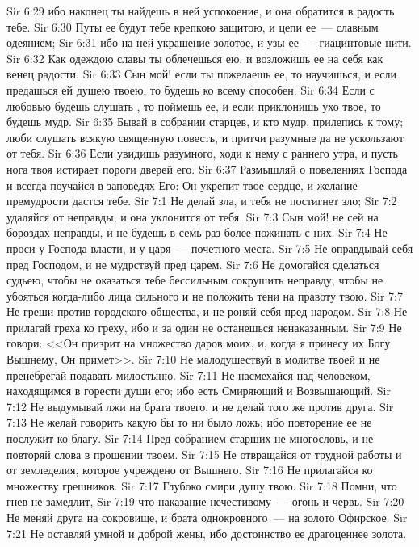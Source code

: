 \vs Sir 6:29 ибо наконец ты найдешь в ней успокоение, и она обратится в радость тебе.
\vs Sir 6:30 Путы ее будут тебе крепкою защитою, и цепи ее~--- славным одеянием;
\vs Sir 6:31 ибо на ней украшение золотое, и узы ее~--- гиацинтовые нити.
\vs Sir 6:32 Как одеждою славы ты облечешься ею, и возложишь ее на себя как венец радости.
\vs Sir 6:33 Сын мой! если ты пожелаешь ее, то научишься, и если предашься ей душею твоею, то будешь ко всему способен.
\vs Sir 6:34 Если с любовью будешь слушать , то поймешь ее, и если приклонишь ухо твое, то будешь мудр.
\vs Sir 6:35 Бывай в собрании старцев, и кто мудр, прилепись к тому; люби слушать всякую священную повесть, и притчи разумные да не ускользают от тебя.
\vs Sir 6:36 Если увидишь разумного, ходи к нему с раннего утра, и пусть нога твоя истирает пороги дверей его.
\vs Sir 6:37 Размышляй о повелениях Господа и всегда поучайся в заповедях Его: Он укрепит твое сердце, и желание премудрости дастся тебе.
\vs Sir 7:1 Не делай зла, и тебя не постигнет зло;
\vs Sir 7:2 удаляйся от неправды, и она уклонится от тебя.
\vs Sir 7:3 Сын мой! не сей на бороздах неправды, и не будешь в семь раз более пожинать с них.
\vs Sir 7:4 Не проси у Господа власти, и у царя~--- почетного места.
\vs Sir 7:5 Не оправдывай себя пред Господом, и не мудрствуй пред царем.
\vs Sir 7:6 Не домогайся сделаться судьею, чтобы не оказаться тебе бессильным сокрушить неправду, чтобы не убояться когда-либо лица сильного и не положить тени на правоту твою.
\vs Sir 7:7 Не греши против городского общества, и не роняй себя пред народом.
\vs Sir 7:8 Не прилагай греха ко греху, ибо и за один не останешься ненаказанным.
\vs Sir 7:9 Не говори: <<Он призрит на множество даров моих, и, когда я принесу их Богу Вышнему, Он примет>>.
\vs Sir 7:10 Не малодушествуй в молитве твоей и не пренебрегай подавать милостыню.
\vs Sir 7:11 Не насмехайся над человеком, находящимся в горести души его; ибо есть Смиряющий и Возвышающий.
\vs Sir 7:12 Не выдумывай лжи на брата твоего, и не делай того же против друга.
\vs Sir 7:13 Не желай говорить какую бы то ни было ложь; ибо повторение ее не послужит ко благу.
\vs Sir 7:14 Пред собранием старших не многословь, и не повторяй слова в прошении твоем.
\vs Sir 7:15 Не отвращайся от трудной работы и от земледелия, которое учреждено от Вышнего.
\vs Sir 7:16 Не прилагайся ко множеству грешников.
\vs Sir 7:17 Глубоко смири душу твою.
\vs Sir 7:18 Помни, что гнев не замедлит,
\vs Sir 7:19 что наказание нечестивому~--- огонь и червь.
\vs Sir 7:20 Не меняй друга на сокровище, и брата однокровного~--- на золото Офирское.
\vs Sir 7:21 Не оставляй умной и доброй жены, ибо достоинство ее драгоценнее золота.

